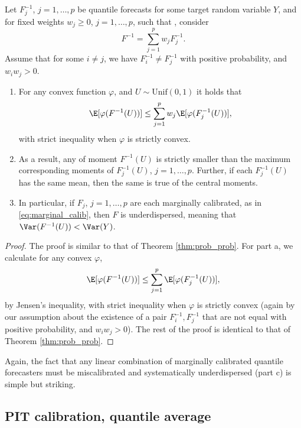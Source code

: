 \documentclass{article}
\begin{document}
\begin{theorem}
\label{thm:marginal_quant}
Let $F_j^{-1}$, $j=1,\dots,p$ be quantile forecasts for some target random
variable $Y$, and for fixed weights $w_j \geq 0$, $j=1,\dots,p$, such that
, consider   
\[
F^{-1} = \sum_{j=1}^p w_j F_j^{-1}.
\]
Assume that for some $i \not= j$, we have $F_i^{-1} \not= F_j^{-1}$ with
positive probability, and $w_iw_j > 0$. 

\begin{enumerate}[label=\alph*.]
\item For any convex function $\varphi$, and $U \sim \mathrm{Unif}(0,1)$ it
  holds that 
\[
\E[\varphi(F^{-1}(U))] \leq \sum_{j=1}^p w_j \E[\varphi(F_j^{-1}(U))], 
\]
with strict inequality when $\varphi$ is strictly convex.

\item As a result, any of moment $F^{-1}(U)$ is strictly smaller than the
  maximum corresponding moments of $F_j^{-1}(U)$, $j=1,\dots,p$. Further, if each 
  $F_j^{-1}(U)$ has the same mean, then the same is true of the central moments.      

\item In particular, if $F_j$, $j=1,\dots,p$ are each marginally calibrated, as
  in \eqref{eq:marginal_calib}, then $F$ is underdispersed, meaning 
  that $\Var(F^{-1}(U)) < \Var(Y)$.
\end{enumerate}
\end{theorem}

\begin{proof}
The proof is similar to that of Theorem \ref{thm:prob_prob}. For part a, we
calculate for any convex $\varphi$,   
\[
\E[\varphi(F^{-1}(U))] \leq \sum_{j=1}^p \E[\varphi(F_j^{-1}(U))],
\]
by Jensen's inequality, with strict inequality when $\varphi$ is strictly 
convex (again by our assumption about the existence of a pair
$F_i^{-1},F_j^{-1}$ that are not equal with positive probability, and
$w_iw_j>0$). The rest of the proof is identical to that of Theorem
\ref{thm:prob_prob}.  
\end{proof}

Again, the fact that any linear combination of marginally calibrated quantile
forecasters must be miscalibrated and systematically underdispersed (part c) is
simple but striking.

\subsection{PIT calibration, quantile average}
\end{document}
